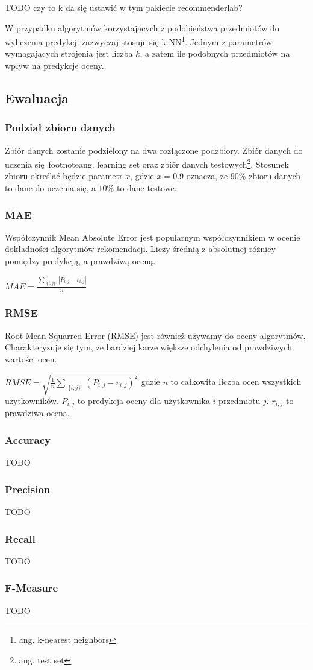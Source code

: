 \documentclass[12pt, a4paper]{article}
\begin{document}
TODO czy to k da się ustawić w tym pakiecie recommenderlab?


W przypadku algorytmów korzystających z podobieństwa przedmiotów do wyliczenia predykcji 
zazwyczaj stosuje się k-NN\footnote{ang. k-nearest neighbors}. Jednym z parametrów 
wymagających strojenia jest liczba $k$, a zatem ile podobnych przedmiotów na wpływ na 
predykcje oceny.

\subsection{Ewaluacja}

\subsubsection{Podział zbioru danych}
Zbiór danych zostanie podzielony na dwa rozłączone podzbiory. Zbiór danych do uczenia się\
footnote{ang. learning set} oraz zbiór danych testowych\footnote{ang. test set}. Stosunek 
zbioru określać będzie parametr $x$, gdzie $x = 0.9$ oznacza, że $90\%$ zbioru danych to 
dane do uczenia się, a $10\%$ to dane testowe.

\subsubsection{MAE}
Współczynnik Mean Absolute Error jest popularnym współczynnikiem w ocenie dokładności 
algorytmów rekomendacji. Liczy średnią z absolutnej różnicy pomiędzy predykcją, a prawdziwą 
oceną.

\begin{math}
MAE = \frac{
	\sum_{\substack{
   \{i, j\}
  }}
  |P_{i,j} - r_{i,j}|
}{n}
\end{math}

\subsubsection{RMSE}
Root Mean Squarred Error (RMSE) jest również używamy do oceny algorytmów. Charakteryzuje 
się tym, że bardziej karze większe odchylenia od prawdziwych wartości ocen.

\begin{math}
RMSE = \sqrt{
	\frac{1}{n} \sum_{ \substack{
		\{i,j\}
	} }
	(P_{i,j} - r_{i,j})^2
}
\end{math}
gdzie $n$ to całkowita liczba ocen wszystkich użytkowników. $P_{i,j}$ to predykcja oceny 
dla użytkownika $i$ przedmiotu $j$. $r_{i,j}$ to prawdziwa ocena.

\subsubsection{Accuracy}
TODO
\subsubsection{Precision}
TODO
\subsubsection{Recall}
TODO
\subsubsection{F-Measure}
TODO

\nocite{*}


\end{document}

